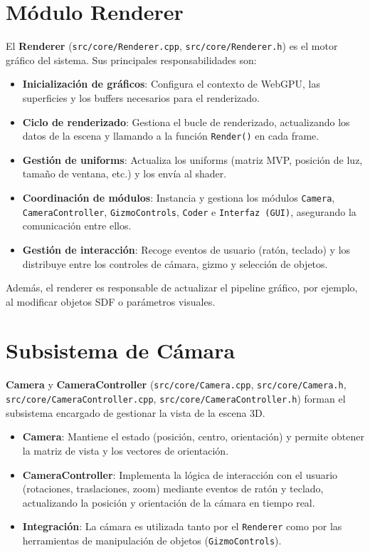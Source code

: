 \section{Módulo Renderer}

El \textbf{Renderer} (\texttt{src/core/Renderer.cpp},
\texttt{src/core/Renderer.h}) es el motor gráfico del sistema. Sus principales
responsabilidades son:
\begin{itemize}
    \item \textbf{Inicialización de gráficos}: Configura el contexto de WebGPU, las superficies y los buffers necesarios para el renderizado.
    \item \textbf{Ciclo de renderizado}: Gestiona el bucle de renderizado, actualizando los datos de la escena y llamando a la función \texttt{Render()} en cada frame.
    \item \textbf{Gestión de uniforms}: Actualiza los uniforms (matriz MVP, posición de luz, tamaño de ventana, etc.) y los envía al shader.
    \item \textbf{Coordinación de módulos}: Instancia y gestiona los módulos \texttt{Camera}, \texttt{CameraController}, \texttt{GizmoControls}, \texttt{Coder} e \texttt{Interfaz (GUI)}, asegurando la comunicación entre ellos.
    \item \textbf{Gestión de interacción}: Recoge eventos de usuario (ratón, teclado) y los distribuye entre los controles de cámara, gizmo y selección de objetos.
\end{itemize}
Además, el renderer es responsable de actualizar el pipeline gráfico, por ejemplo, al modificar objetos SDF o parámetros visuales.

\section{Subsistema de Cámara}

\textbf{Camera} y \textbf{CameraController} (\texttt{src/core/Camera.cpp}, \texttt{src/core/Camera.h}, \texttt{src/core/CameraController.cpp}, \texttt{src/core/CameraController.h}) forman el subsistema encargado de gestionar la vista de la escena 3D.
\begin{itemize}
    \item \textbf{Camera}: Mantiene el estado (posición, centro, orientación) y permite obtener la matriz de vista y los vectores de orientación.
    \item \textbf{CameraController}: Implementa la lógica de interacción con el usuario (rotaciones, traslaciones, zoom) mediante eventos de ratón y teclado, actualizando la posición y orientación de la cámara en tiempo real.
    \item \textbf{Integración}: La cámara es utilizada tanto por el \texttt{Renderer} como por las herramientas de manipulación de objetos (\texttt{GizmoControls}).
\end{itemize}

